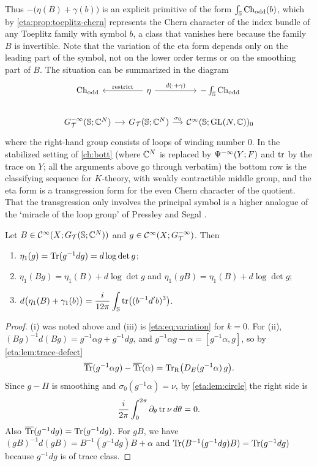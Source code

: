 Thus $-\bigl(\eta(B)+\gamma(b)\bigr)$ is an explicit primitive of the form
$\int_{\mathbb{S}}\operatorname{Ch}_{\mathrm{odd}}(b)$, which by \cref{eta:prop:toeplitz-chern} represents the Chern
character of the index bundle of any Toeplitz family with symbol $b$, a class that
vanishes here because the family $B$ is invertible. Note that the variation of the eta
form depends only on the leading part of the symbol, not on the lower order terms or
on the smoothing part of $B$. The situation can be summarized in the diagram
\[
\begin{tikzcd}[column sep=small]
\Chodd & \eta\arrow[l,"\text{restrict}"']\arrow[r,"d(\cdot+\gamma)"] & -\int_\Sphere\Chodd\\
G^{-\infty}_{\mathcal T}(\Sphere;\C^N)\arrow[r] & \GTeta(\Sphere;\C^N)\arrow[r,"\sigma_0"] &
\CI(\Sphere;\GL(N,\C))_0
\end{tikzcd}
\]
where the right-hand group consists of loops of winding number $0$. In the stabilized
setting of \cref{ch:bott} (where $\mathbb{C}^N$ is replaced by $\Psi^{-\infty}(Y;F)$ and $\operatorname{tr}$
by the trace on $Y$; all the arguments above go through verbatim) the bottom row is
the classifying sequence for $K$-theory, with weakly contractible middle group, and the
eta form is a transgression form for the even Chern character of the quotient. That
the transgression only involves the principal symbol is a higher analogue of the
`miracle of the loop group' of Pressley and Segal \cite{Pressley-Segal}.

\begin{proposition}\label{eta:prop:eta-det}
Let $B\in\mathcal{C}^\infty(X;G_{\mathcal{T}}(\mathbb{S};\mathbb{C}^N))$ and $g\in\mathcal{C}^\infty(X;G^{-\infty}_{\mathcal T})$. Then
\begin{enumerate}[label=(\roman*)]
\item $\eta_1(g)=\operatorname{Tr}(g^{-1}dg)=d\log\det g$;
\item $\eta_1(Bg)=\eta_1(B)+d\log\det g$ and $\eta_1(gB)=\eta_1(B)+d\log\det g$;
\item $d\bigl(\eta_1(B)+\gamma_1(b)\bigr)=\dfrac{i}{12\pi}\displaystyle\int_{\mathbb{S}}\operatorname{tr}\bigl((b^{-1}d'b)^3\bigr)$.
\end{enumerate}
\end{proposition}

\begin{proof} (i) was noted above and (iii) is \eqref{eta:eq:variation} for $k=0$. For
(ii), $(Bg)^{-1}d(Bg)=g^{-1}\alpha g+g^{-1}dg$, and
$g^{-1}\alpha g-\alpha=[g^{-1}\alpha,g]$, so by \cref{eta:lem:trace-defect}
\[
\overline{\operatorname{Tr}}(g^{-1}\alpha g)-\overline{\operatorname{Tr}}(\alpha)=\operatorname{Tr}_{\mathrm{R}}\bigl(D_E(g^{-1}\alpha)\,g\bigr).
\]
Since $g-\Pi$ is smoothing and $\sigma_0(g^{-1}\alpha)=\nu$, by
\cref{eta:lem:circle} the right side is
\[
\frac{i}{2\pi}\int_0^{2\pi}\partial_\theta\operatorname{tr}\nu\,d\theta=0.
\] Also $\overline{\operatorname{Tr}}(g^{-1}dg)=\operatorname{Tr}(g^{-1}dg)$. For $gB$, we have
$(gB)^{-1}d(gB)=B^{-1}(g^{-1}dg)B+\alpha$ and
$\operatorname{Tr}(B^{-1}(g^{-1}dg)B)=\operatorname{Tr}(g^{-1}dg)$ because $g^{-1}dg$ is of trace class.
\end{proof}

